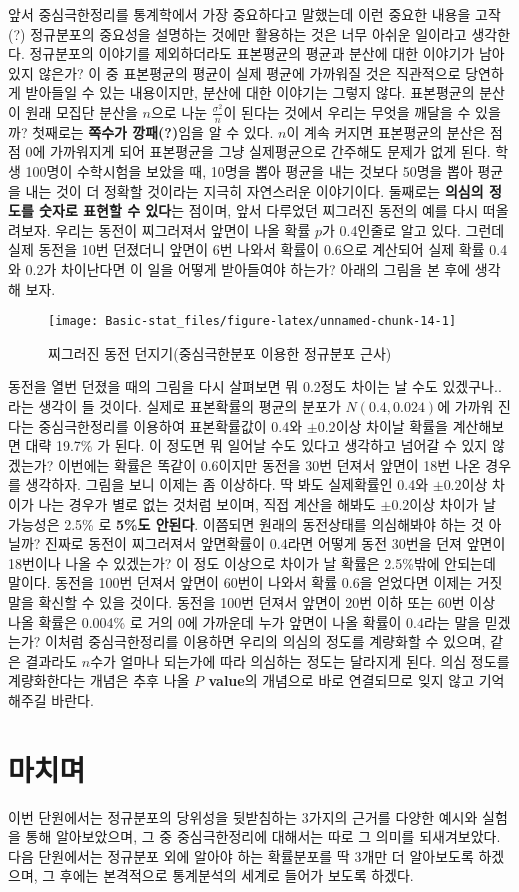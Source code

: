 \documentclass[]{book}
\begin{document}
앞서 중심극한정리를 통계학에서 가장 중요하다고 말했는데 이런 중요한 내용을 고작(?) 정규분포의 중요성을 설명하는 것에만 활용하는 것은 너무 아쉬운 일이라고 생각한다. 정규분포의 이야기를 제외하더라도 표본평균의 평균과 분산에 대한 이야기가 남아있지 않은가? 이 중 표본평균의 평균이 실제 평균에 가까워질 것은 직관적으로 당연하게 받아들일 수 있는 내용이지만, 분산에 대한 이야기는 그렇지 않다. 표본평균의 분산이 원래 모집단 분산을 \(n\)으로 나눈 \(\frac{\sigma^2}{n}\)이 된다는 것에서 우리는 무엇을 깨달을 수 있을까? 첫째로는 \textbf{쪽수가 깡패(?)}임을 알 수 있다. \(n\)이 계속 커지면 표본평균의 분산은 점점 0에 가까워지게 되어 표본평균을 그냥 실제평균으로 간주해도 문제가 없게 된다. 학생 100명이 수학시험을 보았을 때, 10명을 뽑아 평균을 내는 것보다 50명을 뽑아 평균을 내는 것이 더 정확할 것이라는 지극히 자연스러운 이야기이다. 둘째로는 \textbf{의심의 정도를 숫자로 표현할 수 있다}는 점이며, 앞서 다루었던 찌그러진 동전의 예를 다시 떠올려보자. 우리는 동전이 찌그러져서 앞면이 나올 확률 \(p\)가 0.4인줄로 알고 있다. 그런데 실제 동전을 10번 던졌더니 앞면이 6번 나와서 확률이 0.6으로 계산되어 실제 확률 0.4와 0.2가 차이난다면 이 일을 어떻게 받아들여야 하는가? 아래의 그림을 본 후에 생각해 보자.

\begin{figure}

{\centering \texttt{[image: Basic-stat\_files/figure-latex/unnamed-chunk-14-1]} 

}

\caption{찌그러진 동전 던지기(중심극한분포 이용한 정규분포 근사)}\label{fig:unnamed-chunk-14}
\end{figure}

동전을 열번 던졌을 때의 그림을 다시 살펴보면 뭐 0.2정도 차이는 날 수도 있겠구나.. 라는 생각이 들 것이다. 실제로 표본확률의 평균의 분포가 \(N(0.4,0.024)\)에 가까워 진다는 중심극한정리를 이용하여 표본확률값이 0.4와 \(\pm 0.2\)이상 차이날 확률을 계산해보면 대략 19.7\% 가 된다. 이 정도면 뭐 일어날 수도 있다고 생각하고 넘어갈 수 있지 않겠는가? 이번에는 확률은 똑같이 0.6이지만 동전을 30번 던져서 앞면이 18번 나온 경우를 생각하자. 그림을 보니 이제는 좀 이상하다. 딱 봐도 실제확률인 0.4와 \(\pm 0.2\)이상 차이가 나는 경우가 별로 없는 것처럼 보이며, 직접 계산을 해봐도 \(\pm 0.2\)이상 차이가 날 가능성은 2.5\% 로 \textbf{5\%도 안된다}. 이쯤되면 원래의 동전상태를 의심해봐야 하는 것 아닐까? 진짜로 동전이 찌그러져서 앞면확률이 0.4라면 어떻게 동전 30번을 던져 앞면이 18번이나 나올 수 있겠는가? 이 정도 이상으로 차이가 날 확률은 2.5\%밖에 안되는데 말이다. 동전을 100번 던져서 앞면이 60번이 나와서 확률 0.6을 얻었다면 이제는 거짓말을 확신할 수 있을 것이다. 동전을 100번 던져서 앞면이 20번 이하 또는 60번 이상 나올 확률은 0.004\% 로 거의 0에 가까운데 누가 앞면이 나올 확률이 0.4라는 말을 믿겠는가? 이처럼 중심극한정리를 이용하면 우리의 의심의 정도를 계량화할 수 있으며, 같은 결과라도 \(n\)수가 얼마나 되는가에 따라 의심하는 정도는 달라지게 된다. 의심 정도를 계량화한다는 개념은 추후 나올 \textbf{\(P\) value}의 개념으로 바로 연결되므로 잊지 않고 기억해주길 바란다.

\hypertarget{uxb9c8uxce58uxba70-1}{%
\section{마치며}\label{uxb9c8uxce58uxba70-1}}

이번 단원에서는 정규분포의 당위성을 뒷받침하는 3가지의 근거를 다양한 예시와 실험을 통해 알아보았으며, 그 중 중심극한정리에 대해서는 따로 그 의미를 되새겨보았다. 다음 단원에서는 정규분포 외에 알아야 하는 확률분포를 딱 3개만 더 알아보도록 하겠으며, 그 후에는 본격적으로 통계분석의 세계로 들어가 보도록 하겠다.
\end{document}
